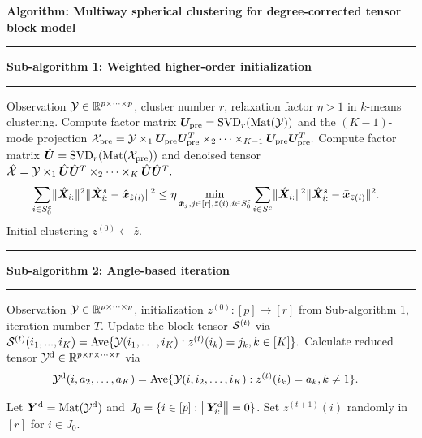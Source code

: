 \documentclass[lettersize,onecolumn,journal]{IEEEtran}
\theoremstyle{definition}
\theoremstyle{definition}
\newcommand\Algphase[1]{%
\vspace*{-.7\baselineskip}\Statex\hspace*{\dimexpr-\algorithmicindent-2pt\relax}\rule{\columnwidth}{0.4pt}%
\Statex\hspace*{-\algorithmicindent}\textbf{#1}%
\vspace*{-.7\baselineskip}\Statex\hspace*{\dimexpr-\algorithmicindent-2pt\relax}\rule{\columnwidth}{0.4pt}%
}
\begin{document}
\begin{algorithm}[h!]
\caption*{\bf Algorithm: Multiway spherical clustering for degree-corrected tensor block model }
\vspace{.15cm}
\begin{algorithmic}[1]
\Algphase{Sub-algorithm 1: Weighted higher-order initialization}
\INPUT Observation $\mathcal{Y} \in \mathbb{R}^{p\times \cdots \times p}$, cluster number $r$, relaxation factor $\eta > 1$ in $k$-means clustering.
\State Compute factor matrix $ \bm{U}_{\text{pre}} = \text{SVD}_{r} (\text{Mat}(\mathcal{Y}))$ and the $(K-1)$-mode projection $
\mathcal{X}_{\text{pre}} = \mathcal{Y} \times_1   \bm{U}_{\text{pre}} \bm{U}_{\text{pre}}^T \times_2 \cdots \times_{K-1}  \bm{U}_{\text{pre}} \bm{U}_{\text{pre}}^T.$
\State Compute factor matrix $\hat {\bm{U}} = \text{SVD}_{r}(\text{Mat}(\mathcal{X}_{\text{pre}}))$ and denoised tensor
$\hat {\mathcal{X}} = \mathcal{Y} \times_1 \hat {\bm{U}} \hat {\bm{U}}^T \times_2 \cdots \times_K \hat {\bm{U}} \hat {\bm{U}}^T.$
\begin{align}
    &\sum_{i \in S_0^c }  \lVert\hat {\bm X}_{i:}\rVert^2 \lVert\hat {\bm X}_{i:}^s - \hat {\bm x}_{\hat z(i)} \rVert^2 
    \leq 
    \eta \min_{\substack{\bar {\bm x}_j, j\in[r], \bar z(i),i\in S_0^{c}}} \sum_{i \in S^c } \lVert\hat {\bm X}_{i:}\rVert^2 \lVert \hat {\bm X}_{i:}^s -   \bar {\bm x}_{\bar z(i)}\rVert^2.
\end{align}
\OUTPUT Initial clustering $z^{(0)} \leftarrow \hat z$.

\Algphase{Sub-algorithm 2: Angle-based iteration}
\INPUT Observation $\mathcal{Y} \in \mathbb{R}^{p \times \cdots \times p}$, initialization $z^{(0)} \colon [p]\to[r]$ from Sub-algorithm 1, iteration number $T$.
\State Update the block tensor $\mathcal{S}^{(t)}$ via
$\mathcal{S}^{(t)} (i_1,...,i_K)= \text{Ave} \{\mathcal{Y}(i_1,\ldots,i_K): z^{(t)}(i_k) = j_k, k \in [K]\}.$
\State Calculate reduced tensor $\mathcal{Y}^{\text{d}} \in \mathbb{R}^{p \times r \times \cdots \times r}$ via
\begin{align}
    &\mathcal{Y}^{\text{d}}(i,a_2,\ldots,a_K) 
    = 
\text{Ave}\{\mathcal{Y}(i,i_2,\ldots,i_K): z^{(t)}(i_k) = a_k, k \neq 1 \}.
\end{align}

\State Let $\bm Y^{\text{d}} = \text{Mat}(\mathcal{Y}^{\text{d}})$ and $J_0 = \{ i\in[p]: \left\lVert\bm Y^{\text{d}}_{i:}\right\rVert = 0\}$. Set $z^{(t+1)}(i)$ randomly in $[r]$ for $i \in J_0$.


\end{algorithmic}
\end{algorithm}
\end{document}
